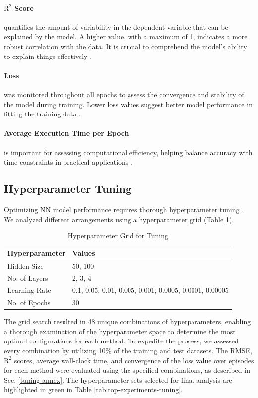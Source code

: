 \documentclass[conference]{IEEEtran}
\begin{document}
{\paragraph{$\text{R}^2$ Score}
quantifies the amount of variability in the dependent variable that can be explained by the model. A higher value, with a maximum of 1, indicates a more robust correlation with the data. It is crucial to comprehend the model's ability to explain things effectively \cite{biomet91nagelkerke}.

\paragraph{Loss}
was monitored throughout all epochs to assess the convergence and stability of the model during training. Lower loss values suggest better model performance in fitting the training data \cite{mit16goodfellow}.

\paragraph{Average Execution Time per Epoch}
is important for assessing computational efficiency, helping balance accuracy with time constraints in practical applications \cite{jproc17sze}.

\subsection{Hyperparameter Tuning}
Optimizing NN model performance requires thorough hyperparameter tuning \cite{mit16goodfellow}. We analyzed different arrangements using a hyperparameter grid (Table \ref{tab:tuning-values}).

\begin{table}[h!]
\centering
\caption{Hyperparameter Grid for Tuning}
\label{tab:tuning-values}
\begin{tabular}{l|p{4cm}}
\textbf{Hyperparameter} & \textbf{Values} \\
\hline
Hidden Size & 50, 100 \\
No. of Layers & 2, 3, 4 \\
Learning Rate & 0.1, 0.05, 0.01, 0.005, 0.001, 0.0005, 0.0001, 0.00005 \\
No. of Epochs & 30 \\
\end{tabular}
\end{table}

The grid search resulted in 48 unique combinations of hyperparameters, enabling a thorough examination of the hyperparameter space to determine the most optimal configurations for each method. To expedite the process, we assessed every combination by utilizing 10\% of the training and test datasets. The RMSE, $\text{R}^2$ scores, average wall-clock time, and convergence of the loss value over episodes for each method were evaluated using the specified combinations, as described in Sec. \ref{tuning-annex}. The hyperparameter sets selected for final analysis are highlighted in green in Table \ref{tab:top-experiments-tuning}.

}
\end{document}
